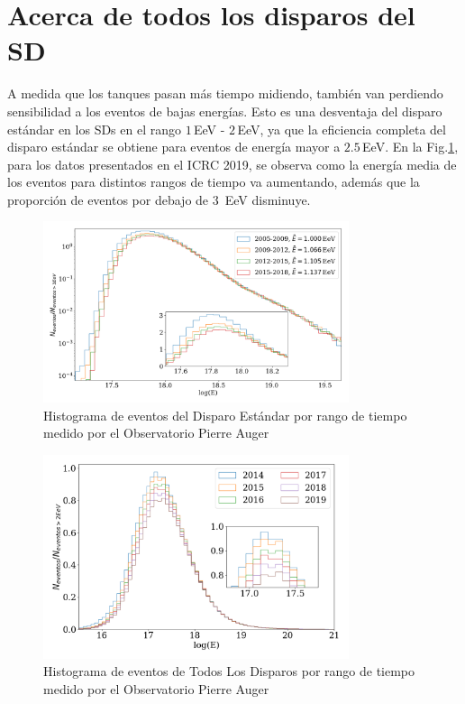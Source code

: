 \section{Acerca de todos los disparos del SD}

A medida que los tanques pasan más tiempo midiendo, también van perdiendo sensibilidad a los eventos de bajas energías. Esto es una desventaja del disparo estándar en los SDs en el rango $1\,$EeV - $2\,$EeV, ya que la eficiencia completa  del disparo estándar se obtiene para eventos de energía mayor a $2.5\,$EeV.  En la Fig.\ref{fig:futuro}, para los datos presentados en el ICRC 2019, se observa como la energía media de los eventos para distintos rangos de tiempo va aumentando, además que la proporción de eventos por debajo de $3\,$ EeV disminuye. 

\begin{figure}[H]
	\centering
	\includegraphics[width=0.8\textwidth]{histograma_evolucion_eventos.png}
	\caption{Histograma de eventos  del Disparo Estándar por rango de tiempo medido por el Observatorio Pierre Auger}
	\label{fig:futuro}
\end{figure}

\begin{figure}[H]
	\centering
	\includegraphics[width=0.8\textwidth]{figura_harari.png}
	\caption{Histograma de eventos de  Todos Los Disparos por rango de tiempo medido por el Observatorio Pierre Auger}
	\label{fig:TLD}
\end{figure}


